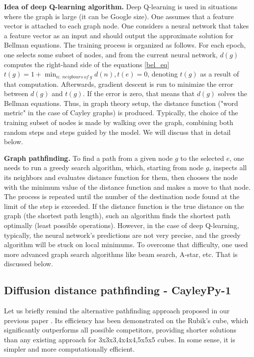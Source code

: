 \documentclass[atmp]{ipart_v1}
\numberwithin{equation}{section}
\theoremstyle{plain}%
\begin{document}
{\bf Idea of deep Q-learning algorithm.}
Deep Q-learning is used in situations where the graph is large (it can be Google size). 
One assumes that a feature vector is attached to each graph node. 
One considers a neural network that takes a feature vector as an input and should output the approximate solution for Bellman equations.
The training process is organized as follows.
For each epoch, one selects some subset of nodes, and from the current neural network, $d(g)$  computes the right-hand side of the equations \ref{bel_eq}
$t(g) = 1+\min_{n:~neigbours~of~g} d(n), t(e) =0$, denoting $t(g)$ as a result of that computation. 
Afterwards, gradient descent is run to minimize the error between $d(g)$ and $t(g)$. If the error is zero, that means that $d(g)$ solves the Bellman equations. Thus, in graph theory setup, the distance function ("word metric" in the case of Cayley graphs) is produced.
Typically, the choice of the training subset of nodes is made by walking over the graph, combining both random steps and steps guided by the model. We will discuss that in detail below.

{\bf Graph pathfinding.}
To find a path from a given node $g$ to the selected  $e$, one needs to run a greedy search algorithm, which, starting from node $g$, inspects all its neighbors and evaluates distance function for them, then chooses the node with the minimum value of the distance function and makes a move to that node. The process is repeated until the number of the destination node found at the limit of the step is exceeded. If the distance function is the true distance on the graph (the shortest path length), such an algorithm finds the shortest path optimally (least possible operations). However, in the case of deep Q-learning, typically, the neural network's predictions are not very precise, and the greedy algorithm will be stuck on local minimums. To overcome that difficulty, one used more advanced graph search algorithms like beam search, A-star, etc. That is discussed below.

\subsection{Diffusion distance pathfinding - CayleyPy-1}
Let us briefly remind the alternative pathfinding approach proposed in our previous paper \cite{chervov2025machinelearningapproachbeats}. Its efficiency has been demonstrated on the Rubik's cube, which significantly outperforms all possible competitors, providing shorter solutions than any existing approach for 3x3x3,4x4x4,5x5x5 cubes. In some sense, it is simpler and more computationally efficient. 
\end{document}
